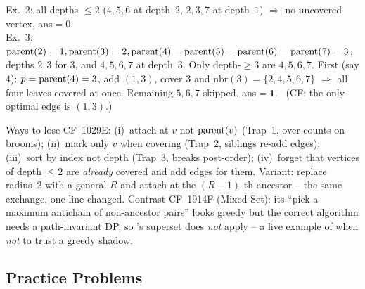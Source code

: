 \begin{tracebox}
Ex.~2: all depths $\le 2$ ($4,5,6$ at depth~$2$, $2,3,7$ at depth~$1$) $\Rightarrow$ no
uncovered vertex, ans$=0$. \checkmark\\
Ex.~3: $\operatorname{parent}(2)=1,\operatorname{parent}(3)=2,\operatorname{parent}(4)=\operatorname{parent}(5)=\operatorname{parent}(6)=\operatorname{parent}(7)=3$;
depths $2,3$ for $3$, and $4,5,6,7$ at depth~$3$. Only depth-$\ge3$ are $4,5,6,7$.
First (say $4$): $p=\operatorname{parent}(4)=3$, add $(1,3)$, cover $3$ and $\mathrm{nbr}(3)=\{2,4,5,6,7\}$
$\Rightarrow$ all four leaves covered at once. Remaining $5,6,7$ skipped. ans$=\mathbf{1}$.
\checkmark\ (CF: the only optimal edge is $(1,3)$.)
\end{tracebox}


\begin{warningbox}
Ways to lose CF~1029E: (i)~attach at $v$ not $\operatorname{parent}(v)$ (Trap~1, over-counts on
brooms); (ii)~mark only $v$ when covering (Trap~2, siblings re-add edges);
(iii)~sort by index not depth (Trap~3, breaks post-order); (iv)~forget that
vertices of depth $\le 2$ are \emph{already} covered and add edges for them.
Variant: replace radius~$2$ with a general $R$ and attach at the $(R{-}1)$-th
ancestor -- the same exchange, one line changed. Contrast CF~1914F (Mixed Set): its
``pick a maximum antichain of non-ancestor pairs'' looks greedy but the correct
algorithm needs a path-invariant DP, so 's superset does
\emph{not} apply -- a live example of when \emph{not} to trust a greedy shadow.
\end{warningbox}

\subsection{Practice Problems}

